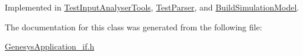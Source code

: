 Implemented in \hyperlink{class_test_input_analyser_tools_a8015a3024f29bddc865cb0b419214cd7}{Test\+Input\+Analyser\+Tools}, \hyperlink{class_test_parser_ae1421b04c5b7420e8d542ebefe46f70e}{Test\+Parser}, and \hyperlink{class_build_simulation_model_a8c50f55d7293860e5e7bc7e7e74f8d4a}{Build\+Simulation\+Model}.



The documentation for this class was generated from the following file\+:\begin{DoxyCompactItemize}
\item 
\hyperlink{_genesys_application__if_8h}{Genesys\+Application\+\_\+if.\+h}\end{DoxyCompactItemize}
